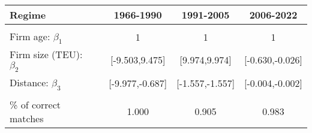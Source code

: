 
\begin{tabular}[t]{lcccc}
\toprule
Regime &  & 1966-1990 & 1991-2005 & 2006-2022\\
\midrule
 &  &  &  \vphantom{1} & \\
Firm age: $\beta_1$ &  & 1 & 1 & 1\\
Firm size (TEU): $\beta_2$ &  & {}[-9.503,9.475] & {}[9.974,9.974] & {}[-0.630,-0.026]\\
Distance: $\beta_3$ &  & {}[-9.977,-0.687] & {}[-1.557,-1.557] & {}[-0.004,-0.002]\\
 &  &  &  & \\
\% of correct matches &  & 1.000 & 0.905 & 0.983\\
\bottomrule
\end{tabular}
